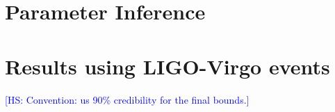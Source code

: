 \documentclass[twocolumn,
               prd,
               aps,
               superscriptaddress,
               tightenlines,
               nofootinbib,
               eqsecnum,
               amsfonts,
               amsmath,
               longbibliography]{revtex4-1}
\newcommand{\hs}[1]{{\textcolor{blue}{{[HS: #1]}} }}
\begin{document}

\section{Parameter Inference}



\section{Results using LIGO-Virgo events}
\label{sec:results}

\hs{Convention: us 90\% credibility for the final bounds.}

\end{document}
